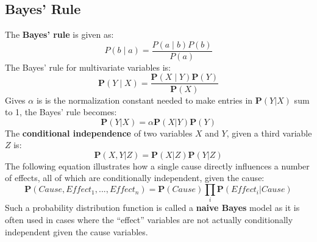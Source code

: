 \documentclass[twoside]{article}
\begin{document}
\subsection{Bayes' Rule}
The \textbf{Bayes' rule} is given as:
\begin{equation}
        P(b \mid a) = \frac{P(a \mid b)P(b)}{P(a)}
\end{equation}
The Bayes' rule for multivariate variables is:
\begin{equation}
        \mathbf P(Y \mid X) = \frac{\mathbf P(X \mid Y) \mathbf P(Y)}{\mathbf P(X)}
\end{equation}
Gives \(\alpha\) is is the normalization constant needed to make entries in 
\(\mathbf P(Y|X)\) sum to 1, the Bayes' rule becomes:
\begin{equation}
        \mathbf P(Y|X) = \alpha \mathbf P(X|Y) \mathbf P(Y)
\end{equation}
The \textbf{conditional independence} of two variables \(X\) and \(Y\), given 
a third variable \(Z\) is:
\begin{equation}
        \mathbf P(X,Y|Z) = \mathbf P(X|Z) \mathbf P(Y|Z)
\end{equation}
The following equation illustrates how a single cause directly influences a 
number of effects, all of which are conditionally 
independent, given the cause:
\begin{equation}
        \mathbf P(Cause, Effect_1,...,Effect_n) = \mathbf P(Cause) \prod _i \mathbf P(Effect_i|Cause)
\end{equation}
Such a probability distribution function is called a \textbf{naive Bayes} 
model as it is often used in cases where the ``effect'' variables are not 
actually conditionally independent given the cause variables.
\end{document}
